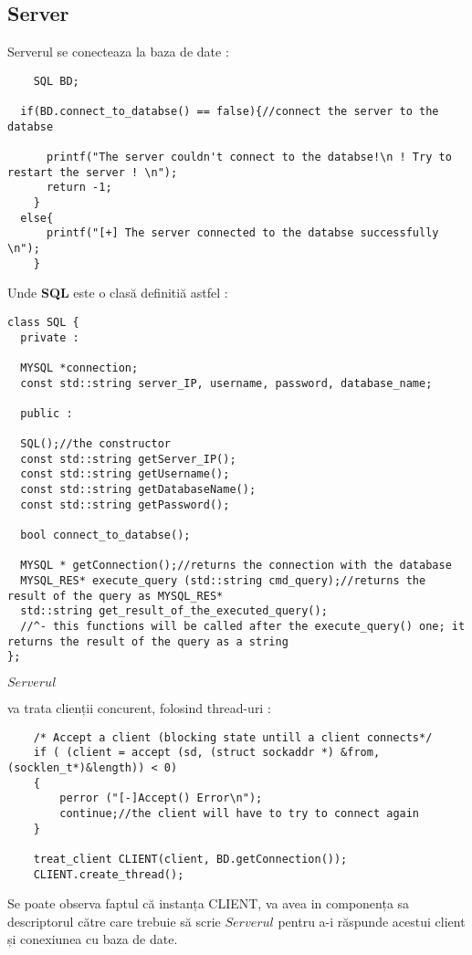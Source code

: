 \documentclass{article}
\begin{document}
 \subsection{Server}
 Serverul se conecteaza la baza de date : 
 \label{sec:serverDataBase}
    \begin{verbatim} 
    SQL BD;

  if(BD.connect_to_databse() == false){//connect the server to the databse

      printf("The server couldn't connect to the databse!\n ! Try to restart the server ! \n");
      return -1;
    }
  else{
      printf("[+] The server connected to the databse successfully \n");
    }
    \end{verbatim} 
Unde \textbf{SQL} este o clasă definitiă astfel : 
\begin{verbatim}
class SQL {
  private :

  MYSQL *connection;
  const std::string server_IP, username, password, database_name;

  public :

  SQL();//the constructor
  const std::string getServer_IP();
  const std::string getUsername();
  const std::string getDatabaseName();
  const std::string getPassword();

  bool connect_to_databse();

  MYSQL * getConnection();//returns the connection with the database
  MYSQL_RES* execute_query (std::string cmd_query);//returns the result of the query as MYSQL_RES*
  std::string get_result_of_the_executed_query();
  //^- this functions will be called after the execute_query() one; it returns the result of the query as a string
};
\end{verbatim}
\hypertarget{sec:ServerCreateThread}{$Serverul $} va trata clienții concurent, folosind thread-uri : 
\begin{verbatim}
    /* Accept a client (blocking state untill a client connects*/
    if ( (client = accept (sd, (struct sockaddr *) &from, (socklen_t*)&length)) < 0)
    {
        perror ("[-]Accept() Error\n");
        continue;//the client will have to try to connect again
    }
    
    treat_client CLIENT(client, BD.getConnection());
    CLIENT.create_thread();
\end{verbatim}
Se poate observa faptul că instanța CLIENT, va avea in componența sa descriptorul către care trebuie să scrie $Serverul$ pentru a-i răspunde acestui client și conexiunea cu baza de date.
\end{document}
